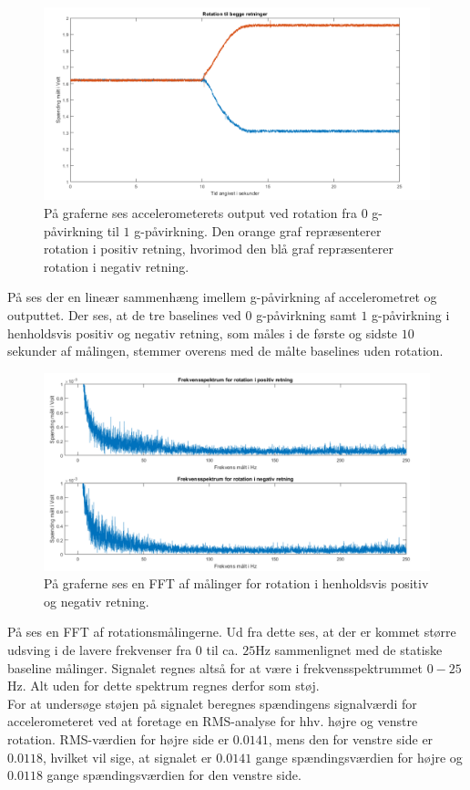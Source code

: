 \begin{figure}[H]
	\centering
	\includegraphics[scale=0.45]{figures/cProblemloesning/Pilotforsoeg_Rotation.png}
	\caption{På graferne ses accelerometerets output ved rotation fra $0$ g-påvirkning til $1$ g-påvirkning. Den orange graf repræsenterer rotation i positiv retning, hvorimod den blå graf repræsenterer rotation i negativ retning.}
	\label{Fig:Pilot_Rottid}
\end{figure}
\noindent På  ses der en lineær sammenhæng imellem g-påvirkning af accelerometret og outputtet. Der ses, at de tre baselines ved $0$ g-påvirkning samt $1$ g-påvirkning i henholdsvis positiv og negativ retning, som måles i de første og sidste $10$ sekunder af målingen, stemmer overens med de målte baselines uden rotation.
\begin{figure}[H]
	\centering
	\includegraphics[scale=0.5]{figures/cProblemloesning/Pilotforsoeg_RotationFrekvens.png}
	\caption{På graferne ses en FFT af målinger for rotation i henholdsvis positiv og negativ retning.}
	\label{Fig:Pilot_Rotfrek}
\end{figure}
\noindent På  ses en FFT af rotationsmålingerne. Ud fra dette ses, at der er kommet større udsving i de lavere frekvenser fra $0$ til ca. $25$Hz sammenlignet med de statiske baseline målinger. Signalet regnes altså for at være i frekvensspektrummet $0-25$Hz. Alt uden for dette spektrum regnes derfor som støj. \\
For at undersøge støjen på signalet beregnes spændingens signalværdi for accelerometeret ved at foretage en RMS-analyse for hhv. højre og venstre rotation. RMS-værdien for højre side er $0.0141$, mens den for venstre side er $0.0118$, hvilket vil sige, at signalet er $0.0141$ gange spændingsværdien for højre og $0.0118$ gange spændingsværdien for den venstre side.

